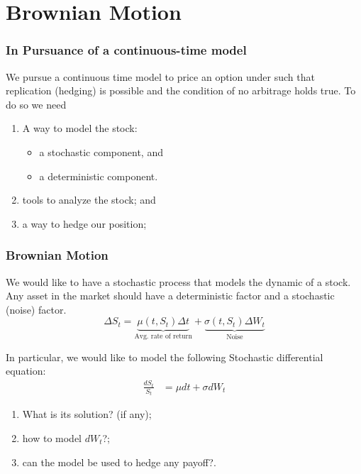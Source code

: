 \documentclass{beamer}
\begin{document}
\section{Brownian Motion}
\begin{frame}
\frametitle{In Pursuance of a continuous-time model}
We pursue a continuous time model to price an option under such that replication (hedging) is possible and the condition of no arbitrage holds true. To do so we need
\begin{enumerate}
	\item A way to model the stock:
	\begin{itemize}
		\item a stochastic component, and
		\item a deterministic component.
	\end{itemize}
	\item tools to analyze the stock; and
	\item a way to hedge our position;
\end{enumerate}
\end{frame}

\begin{frame}
\frametitle{Brownian Motion}
We would like to have a stochastic process that models the dynamic of a stock. Any asset in the market should have a deterministic factor and a stochastic (noise) factor.
\begin{equation}
	\Delta S_t = \underbrace{\mu(t, S_t) \Delta t}_\text{Avg. rate of return} +
				 \underbrace{\sigma(t, S_t) \Delta W_t}_\text{Noise}
\end{equation}
\end{frame}

\begin{frame}
	In particular, we would like to model the following Stochastic differential equation:
	\begin{align*}
		\frac{dS_t}{S_t} &= \mu dt + \sigma dW_t
	\end{align*}
\begin{enumerate}
	\item What is its solution? (if any);
	\item how to model $dW_t$?;
	\item can the model be used to hedge any payoff?.
\end{enumerate}
\end{frame}
\end{document}

